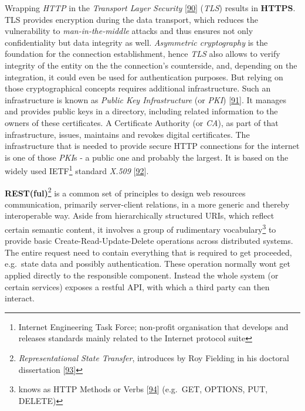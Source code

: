 \documentclass[12pt,english,a4paper,titlepage,cleardoublepage=empty,dottedtoc]{report}
\begin{document}
Wrapping \emph{HTTP} in the \emph{Transport Layer Security}
{[}\protect\hyperlink{ref-web_spec_tls}{90}{]} (\emph{TLS}) results in
\textbf{HTTPS}. TLS provides encryption during the data transport, which
reduces the vulnerability to \emph{man-in-the-middle} attacks and thus
ensures not only confidentiality but data integrity as well.
\emph{Asymmetric cryptography} is the foundation for the connection
establishment, hence \emph{TLS} also allows to verify integrity of the
entity on the the connection's counterside, and, depending on the
integration, it could even be used for authentication purposes. But
relying on those cryptographical concepts requires additional
infrastructure. Such an infrastructure is known as \emph{Public Key
Infrastructure} (or \emph{PKI})
{[}\protect\hyperlink{ref-book_2014_chapter-14-5-pki}{91}{]}. It manages
and provides public keys in a directory, including related information
to the owners of these certificates. A Certificate Authority (or
\emph{CA}), as part of that infrastructure, issues, maintains and
revokes digital certificates. The infrastructure that is needed to
provide secure HTTP connections for the internet is one of those
\emph{PKI}s - a public one and probably the largest. It is based on the
widely used IETF\footnote{Internet Engineering Task Force; non-profit
  organisation that develops and releases standards mainly related to
  the Internet protocol suite} standard \emph{X.509}
{[}\protect\hyperlink{ref-web_spec_x509}{92}{]}.

\textbf{REST(ful)}\footnote{\emph{Representational State Transfer},
  introduces by Roy Fielding in his doctoral dissertation
  {[}\protect\hyperlink{ref-web_spec_rest}{93}{]}} is a common set of
principles to design web resources communication, primarily
server-client relations, in a more generic and thereby interoperable
way. Aside from hierarchically structured URIs, which reflect certain
semantic content, it involves a group of rudimentary
vocabulary\footnote{knows as HTTP Methods or Verbs
  {[}\protect\hyperlink{ref-web_spec_http-methods}{94}{]} (e.g.~GET,
  OPTIONS, PUT, DELETE)} to provide basic Create-Read-Update-Delete
operations across distributed systems. The entire request need to
contain everything that is required to get proceeded, e.g.~state data
and possibly authentication. These operation normally wont get applied
directly to the responsible component. Instead the whole system (or
certain services) exposes a restful API, with which a third party can
then interact.
\end{document}
